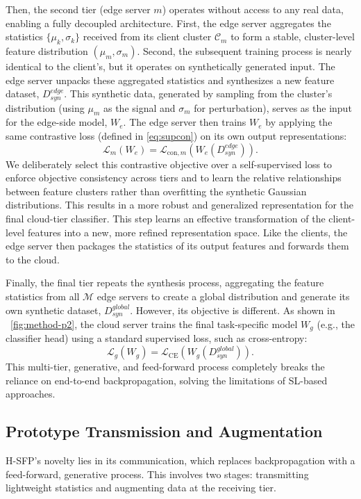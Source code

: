     Then, the second tier (edge server $m$) operates without access to any real data, enabling a fully decoupled architecture. First, the edge server aggregates the statistics $\{\mu_k, \sigma_k\}$ received from its client cluster $\mathcal{C}_m$ to form a stable, cluster-level feature distribution $(\mu_m, \sigma_m)$. Second, the subsequent training process is nearly identical to the client's, but it operates on synthetically generated input. The edge server unpacks these aggregated statistics and synthesizes a new feature dataset, $D_{syn}^{edge}$. This synthetic data, generated by sampling from the cluster's distribution (using $\mu_m$ as the signal and $\sigma_m$ for perturbation), serves as the input for the edge-side model, $W_e$. The edge server then trains $W_e$ by applying the same contrastive loss (defined in \cref{eq:supcon}) on its own output representations:
    \begin{equation}
        \mathcal{L}_m(W_e) = \mathcal{L}_{\text{con}, m}(W_e(D_{syn}^{edge})).
    \end{equation}
    We deliberately select this contrastive objective over a self-supervised loss to enforce objective consistency across tiers and to learn the relative relationships between feature clusters rather than overfitting the synthetic Gaussian distributions. This results in a more robust and generalized representation for the final cloud-tier classifier. This step learns an effective transformation of the client-level features into a new, more refined representation space. Like the clients, the edge server then packages the statistics of its output features and forwards them to the cloud.
    
    Finally, the final tier repeats the synthesis process, aggregating the feature statistics from all $\mathcal{M}$ edge servers to create a global distribution and generate its own synthetic dataset, $D_{syn}^{global}$. However, its objective is different. As shown in ~\cref{fig:method-p2}, the cloud server trains the final task-specific model $W_g$ (e.g., the classifier head) using a standard supervised loss, such as cross-entropy:
    \begin{equation}
        \mathcal{L}_g(W_g) = \mathcal{L}_{\text{CE}}(W_g(D_{syn}^{global})).
    \end{equation}
    This multi-tier, generative, and feed-forward process completely breaks the reliance on end-to-end backpropagation, solving the limitations of SL-based approaches.
    

\subsection{Prototype Transmission and Augmentation}
\label{sec:transmission_augmentation}
    H-SFP's novelty lies in its communication, which replaces backpropagation with a feed-forward, generative process. This involves two stages: transmitting lightweight statistics and augmenting data at the receiving tier.

